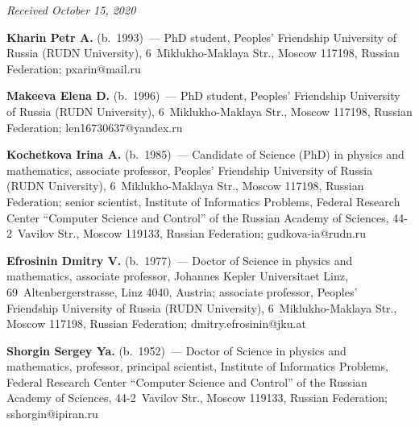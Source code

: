\vspace*{-3pt}

\hfill{\small\textit{Received October 15, 2020}}



\Contr

\noindent
\textbf{Kharin Petr A.} (b.\ 1993)~--- PhD student, Peoples' Friendship University of Russia 
(RUDN University), 
6~Miklukho-Maklaya Str., Moscow 117198, Russian Federation; \mbox{pxarin@mail.ru}

\vspace*{3pt}

\noindent
\textbf{Makeeva Elena D.} (b.\ 1996)~--- PhD student, Peoples' Friendship University of Russia 
(RUDN University), 
6~Miklukho-Maklaya Str., Moscow 117198, Russian Federation; \mbox{len16730637@yandex.ru}

\vspace*{3pt}

\noindent
\textbf{Kochetkova Irina A.} (b.\ 1985)~--- Candidate of Science (PhD) in physics and mathematics, 
associate professor, Peoples' Friendship University of Russia (RUDN University), 
6~Miklukho-Maklaya Str., Moscow 117198, Russian Federation; senior scientist, Institute of Informatics 
Problems, Federal Research Center ``Computer Science and Control'' of the Russian Academy of Sciences, 
44-2~Vavilov Str., Moscow 119133, Russian Federation; \mbox{gudkova-ia@rudn.ru}

\vspace*{3pt}

\noindent
\textbf{Efrosinin Dmitry V.} (b.\ 1977)~--- Doctor of Science in physics and mathematics, associate 
professor, Johannes Kepler Universitaet Linz, 69~Altenbergerstrasse, Linz 4040, Austria; associate 
professor, Peoples' Friendship University of Russia (RUDN University), 6~Miklukho-Maklaya Str., 
Moscow 117198, Russian Federation; \mbox{dmitry.efrosinin@jku.at}

\vspace*{3pt}

\noindent
\textbf{Shorgin Sergey Ya.} (b.\ 1952)~--- Doctor of Science in physics and mathematics, professor, 
principal scientist, Institute of Informatics Problems, Federal Research Center 
``Computer Science and Control'' of the Russian Academy of Sciences, 44-2~Vavilov Str., 
Moscow 119133, Russian Federation; \mbox{sshorgin@ipiran.ru}
\label{end\stat}

\renewcommand{\bibname}{\protect\rm Литература} 